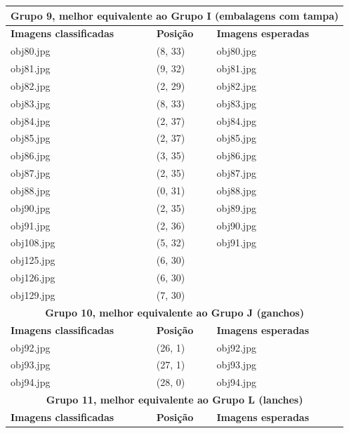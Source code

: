 \begin{center}
\begin{longtable}{|l|l|l|}
    \multicolumn{3}{|c|}{\textbf{Grupo 9, melhor equivalente ao Grupo I
      (embalagens com tampa)}} \\
    \hline\hline
    \textbf{Imagens classificadas} & \textbf{Posição} & \textbf{Imagens esperadas} \\
    \hline\hline

    obj80.jpg  & (8, 33) & obj80.jpg \\
    \hline
    obj81.jpg  & (9, 32) & obj81.jpg \\
    \hline
    obj82.jpg  & (2, 29) & obj82.jpg \\
    \hline
    obj83.jpg  & (8, 33) & obj83.jpg \\
    \hline
    obj84.jpg  & (2, 37) & obj84.jpg \\
    \hline
    obj85.jpg  & (2, 37) & obj85.jpg \\
    \hline
    obj86.jpg  & (3, 35) & obj86.jpg \\
    \hline
    obj87.jpg  & (2, 35) & obj87.jpg \\
    \hline
    obj88.jpg  & (0, 31) & obj88.jpg \\
    \hline
    obj90.jpg  & (2, 35) & obj89.jpg \\
    \hline
    obj91.jpg  & (2, 36) & obj90.jpg \\
    \hline
    obj108.jpg & (5, 32) & obj91.jpg \\
    \hline
    obj125.jpg & (6, 30) & \\
    \hline
    obj126.jpg & (6, 30) & \\
    \hline
    obj129.jpg & (7, 30) & \\
    \hline\hline

    \multicolumn{3}{|c|}{\textbf{Grupo 10, melhor equivalente ao Grupo J
      (ganchos)}} \\
    \hline\hline
    \textbf{Imagens classificadas} & \textbf{Posição} & \textbf{Imagens esperadas} \\
    \hline\hline

    obj92.jpg & (26, 1) & obj92.jpg \\
    \hline
    obj93.jpg & (27, 1) & obj93.jpg \\
    \hline
    obj94.jpg & (28, 0) & obj94.jpg \\
    \hline\hline

    \multicolumn{3}{|c|}{\textbf{Grupo 11, melhor equivalente ao Grupo L
      (lanches)}} \\
    \hline\hline
    \textbf{Imagens classificadas} & \textbf{Posição} & \textbf{Imagens esperadas} \\
    \hline\hline


\end{longtable}
\end{center}
